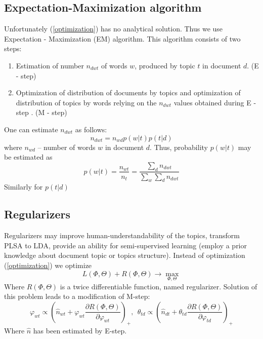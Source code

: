     \subsection{Expectation\--Maximization algorithm} \label{EMAlgorithm}
	    Unfortunately (\ref{optimization}) has no analytical solution. Thus we use Expectation \-- Maximization (EM) algorithm.
	    This algorithm consists of two steps:
	    \begin{enumerate}
		\item Estimation of number $n_{dwt}$ of words $w$, produced by topic $t$ in document $d$. (E \-- step)
		\item Optimization of distribution of documents by topics and optimization of distribution of topics by words relying on
		    the $n_{dwt}$ values obtained during E \-- step . (M \-- step)
	    \end{enumerate}
	    One can estimate $n_{dwt}$ as follows:
	    \begin{equation}  n_{dwt} = n_{wd} p(w|t) p(t|d) \end{equation}
	    where $n_{wd}$ \--- number of words $w$ in document $d$.
	    Thus, probability $p(w|t)$ may be estimated as
	    \begin{equation}  p(w|t) = \frac{n_{wt}}{n_t} = \frac{\sum_d n_{dwt} }{\sum_w \sum_d n_{dwt}}   \end{equation}
	    Similarly for $p(t|d)$

    \subsection{Regularizers} \label{Regularizers}
	Regularizers may improve human-understandability of the topics, transform PLSA to LDA, provide an ability
	for semi-supervised learning (employ a prior knowledge about document topic or topics structure).
	Instead of optimization (\ref{optimization}) we optimize
	\begin{equation} \label{optimizeWithReqularizer} L(\Phi, \Theta) + R(\Phi, \Theta) \to \max_{\Phi, \Theta} \end{equation}
	Where $R(\Phi, \Theta)$ is a twice differentiable function, named regularizer.
	Solution of this problem leads to a modification of M\--step:
	\begin{equation}
	    \label{RegularizersEquation}
	    \varphi_{wt} \propto \left(\hat{n}_{wt} + \varphi_{wt} \frac{\partial  R(\Phi, \Theta)}{\partial \varphi_{wt}} \right)_+ ,\ \
	    \theta_{td} \propto \left(\hat{n}_{dt} + \theta_{td}\frac{\partial  R(\Phi, \Theta)}{\partial \varphi_{td}} \right)_+
	\end{equation}
	Where $\hat{n}$ has been estimated by E\--step.

